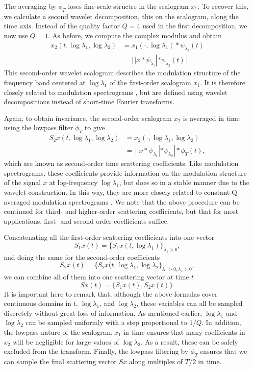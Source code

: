\documentclass{article}
\newcommand{\lau}{{\lambda_1}}
\newcommand{\lad}{{\lambda_2}}
\begin{document}
\begin{sloppy}
The averaging by $\phi_T$ loses fine-scale structre in the scalogram $x_1$. To recover this, we calculate a second wavelet decomposition, this on the scalogram, along the time axis. Instead of the quality factor $Q = 4$ used in the first decomposition, we now use $Q = 1$. As before, we compute the complex modulus and obtain
\begin{align}
	\nonumber
	x_2(t, \log \lau, \log \lad) &= x_1(\cdot, \log \lau) \ast \psi_\lad(t) \\
	&= |\,| x \ast \psi_\lau | \ast \psi_\lad (t) |.
\end{align}
This second-order wavelet scalogram describes the modulation structure of the frequency band centered at $\log \lau$ of the first-order scalogram $x_1$. It is therefore closely related to modulation spectrograms \cite{atlas}, but are defined using wavelet decompositions instead of short-time Fourier transforms.

Again, to obtain invariance, the second-order scalogram $x_2$ is averaged in time using the lowpass filter $\phi_T$ to give
\begin{align}
	\nonumber
	S_2 x(t, \log \lau, \log \lad) &= x_2(\cdot, \log \lau, \log \lad) \\
	&= |\,| x \ast \psi_\lau | \ast \psi_\lad | \ast \phi_T(t),
\end{align}
which are known as second-order time scattering coefficients. Like modulation spectrograms, these coefficients provide information on the modulation structure of the signal $x$ at log-frequency $\log \lau$, but does so in a stable manner due to the wavelet construction. In this way, they are more closely related to constant-Q averaged modulation spectrograms \cite{ellis-mcdermott}. We note that the above procedure can be continued for third- and higher-order scattering coefficients, but that for most applications, first- and second-order coefficients suffice.

Concatenating all the first-order scattering coefficients into one vector
\begin{equation}
	S_1x(t) = \{S_1x(t, \log \lau)\}_{\lau>0},
\end{equation}
and doing the same for the second-order coefficients
\begin{equation}
	S_2x(t) = \{S_2x(t, \log \lau, \log \lad\}_{\lau>0, \lad>0},
\end{equation}
we can combine all of them into one scattering vector at time $t$
\begin{equation}
	Sx(t) = \{S_1x(t), S_2x(t)\}.
\end{equation}
It is important here to remark that, although the above formulas cover continuous domains in $t$, $\log \lau$, and $\log \lad$, these variables can all be sampled discretely without great loss of information. As mentioned earlier, $\log \lau$ and $\log \lad$ can be sampled uniformly with a step proportional to $1/Q$. In addition, the lowpass nature of the scalogram $x_1$ in time ensures that many coefficients in $x_2$ will be negligible for large values of $\log \lad$. As a result, these can be safely excluded from the transform. Finally, the lowpass filtering by $\phi_T$ ensures that we can sample the final scattering vector $Sx$ along multiples of $T/2$ in time.


\end{sloppy}
\end{document}
